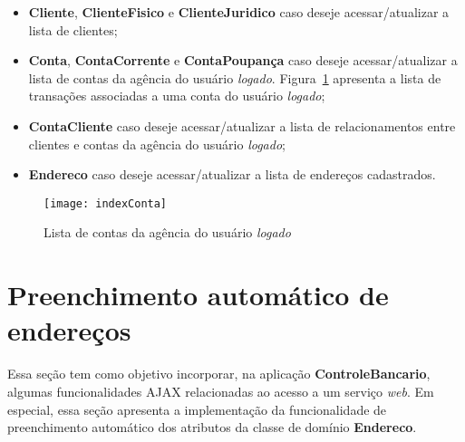 \begin{itemize}

\item  {\bf Cliente}, {\bf  ClienteFisico} e  {\bf ClienteJuridico}  caso deseje
  acessar/atualizar a lista de clientes; 

\vspace{0.3cm}

\item  {\bf  Conta},  {\bf  ContaCorrente}  e {\bf  ContaPoupança}  caso  deseje
  acessar/atualizar  a lista  de  contas  da agência  do  usuário {\it  logado}.
  Figura~\ref{indexContaFig} apresenta  a lista  de transações associadas  a uma
  conta do usuário {\it logado}; 

\vspace{0.3cm}

\item   {\bf   ContaCliente}   caso   deseje  acessar/atualizar   a   lista   de
  relacionamentos entre clientes e contas da agência do usuário {\it logado};

\vspace{0.3cm}

\item  {\bf  Endereco}  caso  deseje  acessar/atualizar  a  lista  de  endereços
  cadastrados.
 
\end{itemize}

\vspace{0.3cm}

\begin{figure}[htbp]
\centering\texttt{[image: indexConta]}
\caption{Lista de contas da agência do usuário {\it logado}}
\label{indexContaFig}
\end{figure}

\newpage

\section{Preenchimento automático de endereços}\label{secAutoFill}

\vspace{0.5cm}

Essa seção  tem como objetivo  incorporar, na aplicação  {\bf ControleBancario},
algumas funcionalidades AJAX  relacionadas ao acesso a um  serviço {\it web}. Em
especial,   essa  seção   apresenta   a  implementação   da  funcionalidade   de
preenchimento automático dos atributos da classe de domínio {\bf Endereco}. 

